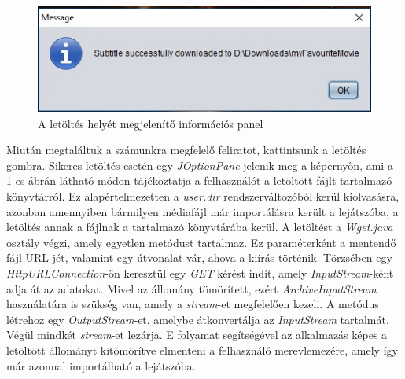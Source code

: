 \begin{spacing}{1.25}
\begin{figure}
  \includegraphics[width=\linewidth]{images/downloaded_sub.jpg}
  \caption{A letöltés helyét megjelenítő információs panel}
  \label{fig:downloaded_sub}
\end{figure}
\end{spacing}

Miután megtaláltuk a számunkra megfelelő feliratot, kattintsunk a letöltés gombra. Sikeres letöltés esetén egy \textit{JOptionPane} jelenik meg a képernyőn, ami a \ref{fig:downloaded_sub}-es ábrán látható módon tájékoztatja a felhasználót a letöltött fájlt tartalmazó könyvtárról. Ez alapértelmezetten a \textit{user.dir} rendszerváltozóból kerül kiolvasásra, azonban amennyiben bármilyen médiafájl már importálásra került a lejátszóba, a letöltés annak a fájlnak a tartalmazó könyvtárába kerül.
A letöltést a \textit{Wget.java} osztály végzi, amely egyetlen metódust tartalmaz. Ez paraméterként a mentendő fájl URL-jét, valamint egy útvonalat vár, ahova a kiírás történik. Törzsében egy \textit{HttpURLConnection}-ön keresztül egy \textit{GET} kérést indít, amely \textit{InputStream}-ként adja át az adatokat. Mivel az állomány tömörített, ezért \textit{ArchiveInputStream} használatára is szükség van, amely a \textit{stream}-et megfelelően kezeli. A metódus létrehoz egy \textit{OutputStream}-et, amelybe átkonvertálja az \textit{InputStream} tartalmát. Végül mindkét \textit{stream}-et lezárja. E folyamat segítségével az alkalmazás képes a letöltött állományt kitömörítve elmenteni a felhasználó merevlemezére, amely így már azonnal importálható a lejátszóba.